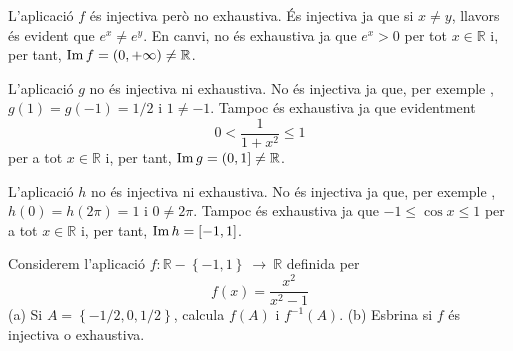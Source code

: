 \begin{solucio}
L'aplicació $f$ és injectiva però no exhaustiva. És
injectiva ja que si $x\neq y$, llavors és evident que $e^{x}\neq e^{y}$.
En canvi, no és exhaustiva ja que $e^{x}>0$ per tot $x\in \mathbb{R}$ i,
per tant, $\operatorname{Im}f=(0,+\infty )\neq \mathbb{R}$.

L'aplicació $g$ no és injectiva ni exhaustiva. No és injectiva
ja que, per exemple , $g(1)=g(-1)=1/2$ i $1\neq -1$. Tampoc és
exhaustiva ja que evidentment
\begin{equation*}
0<\frac{1}{1+x^{2}}\leq 1
\end{equation*}%
per a tot $x\in \mathbb{R}$ i, per tant, $\operatorname{Im}g=(0,1]\neq \mathbb{R}$.

L'aplicació $h$ no és injectiva ni exhaustiva. No és injectiva
ja que, per exemple , $h(0)=h(2\pi )=1$ i $0\neq 2\pi $. Tampoc és
exhaustiva ja que $-1\leq \cos x\leq 1$ per a tot $x\in \mathbb{R}$ i, per
tant, $\operatorname{Im}h=[-1,1]$.
\end{solucio}

\begin{exercici}
Considerem l'aplicació $f:\mathbb{R}-\left\{ -1,1\right\}
~\longrightarrow ~\mathbb{R}$ definida per%
\begin{equation*}
f(x)=\frac{x^{2}}{x^{2}-1}
\end{equation*}%
(a) Si $A=\left\{ -1/2,0,1/2\right\} $, calcula $f(A)$ i $f^{-1}(A)$. (b)
Esbrina si $f$ és injectiva o exhaustiva.
\end{exercici}

